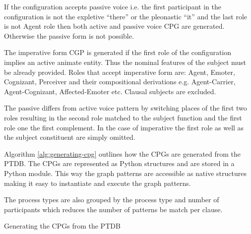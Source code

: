 
If the configuration accepts passive voice i.e. the first participant in the configuration is not the expletive ``there'' or the pleonastic ``it'' and the last role is not Agent role then both active and passive voice CPG are generated. Otherwise the passive form is not possible. 

The imperative form CGP is generated if the first role of the configuration implies an active animate entity. Thus the nominal features of the subject must be already provided. Roles that accept imperative form are: Agent, Emoter, Cognizant, Perceiver and their compositional derivations e.g. Agent-Carrier, Agent-Cognizant, Affected-Emoter etc. Clausal subjects are excluded. 

The passive differs from active voice pattern by switching places of the first two roles resulting in the second role matched to the subject function and the first role one the first complement. In the case of imperative the first role  as well as the subject constituent are simply omitted.  

Algorithm \ref{alg:generating-cpg} outlines how the CPGs are generated from the PTDB. The CPGs are represented as Python structures and are stored in a Python module. This way the graph patterns are accessible as native structures making it easy to instantiate and execute the graph patterns. 

The process types are also grouped by the process type and number of participants which reduces the number of patterns be match per clause.  

\begin{algorithm}[!ht]
	\caption{Generating the CPGs from the PTDB}
	\label{alg:generating-cpg}
\end{algorithm}

